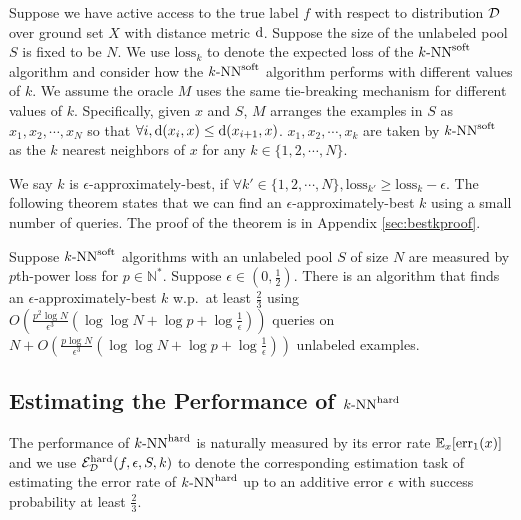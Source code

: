 Suppose we have active access to the true label $f$ with respect to distribution ${\mathcal{D}}$ over ground set $X$ with distance metric ${\mathrm{d}}$. Suppose the size of the unlabeled pool $S$ is fixed to be $N$. We use $\mathrm{loss}_k$ to denote the expected loss of the ${\text{$k$-NN}^{\mathrm{soft}}}$ algorithm and consider how the ${\text{$k$-NN}^{\mathrm{soft}}}$ algorithm performs with different values of $k$. We assume the oracle $M$ uses the same tie-breaking mechanism for different values of $k$. Specifically, given $x$ and $S$, $M$ arranges the examples in $S$ as $x_1,x_2,\cdots,x_N$ so that $\forall i,{\mathrm{d}}(x_i,x)\leq {\mathrm{d}}(x_{i+1},x)$. $x_1,x_2,\cdots,x_k$ are taken by ${\text{$k$-NN}^{\mathrm{soft}}}$ as the $k$ nearest neighbors of $x$ for any $k\in\{1,2,\cdots,N\}$.


We say $k$ is $\epsilon$-approximately-best, if $\forall k'\in\{1,2,\cdots, N\},\mathrm{loss}_{k'}\geq \mathrm{loss}_{k}-\epsilon$. The following theorem states that we can find an $\epsilon$-approximately-best $k$ using a small number of queries. The proof of the theorem is in Appendix \ref{sec:bestkproof}.
\begin{theorem}
\label{thm:bestk}
Suppose ${\text{$k$-NN}^{\mathrm{soft}}}$ algorithms with an unlabeled pool $S$ of size $N$ are measured by $p$th-power loss for $p\in\mathbb N^*$. Suppose $\epsilon\in(0,\frac{1}{2})$. There is an algorithm that finds an $\epsilon$-approximately-best $k$ w.p.\ at least $\frac{2}{3}$ using $O(\frac{p^2\log N}{\epsilon^3}(\log\log N+\log p+\log\frac{1}{\epsilon}))$ queries on $N+O(\frac{p\log N}{\epsilon^3}(\log\log N+\log p+\log\frac{1}{\epsilon}))$ unlabeled examples.
\end{theorem}

\subsection{Estimating the Performance of ${\text{$k$-NN}^{\mathrm{hard}}}$}
\label{subsec:mv}
The performance of ${\text{$k$-NN}^{\mathrm{hard}}}$ is naturally measured by its error rate $\mathbb E_{x}[{\mathrm{err}_1}(x)]$ and we use $\mathcal{E}^{\mathrm{hard}}_{{\mathcal{D}}}(f,\epsilon,S,k)$ to denote the corresponding estimation task of estimating the error rate of ${\text{$k$-NN}^{\mathrm{hard}}}$ up to an additive error $\epsilon$ with success probability at least $\frac{2}{3}$.


